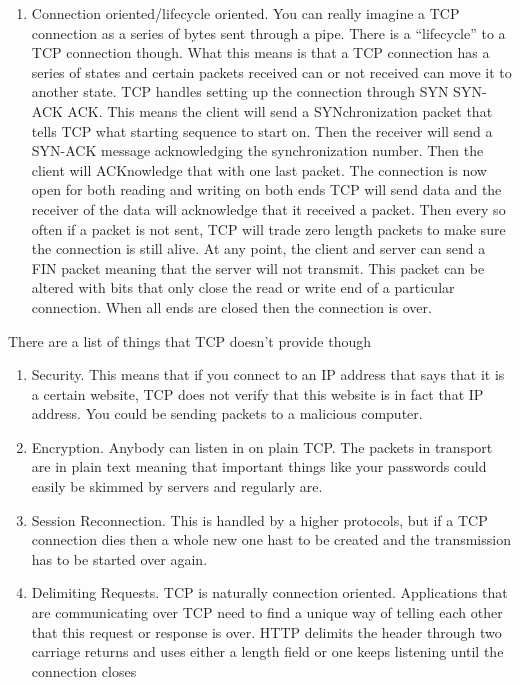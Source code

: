 \begin{enumerate}
\item Connection oriented/lifecycle oriented.
  You can really imagine a TCP connection as a series of bytes sent through a pipe.
  There is a ``lifecycle'' to a TCP connection though. What this means is that a TCP connection has a series of states and certain packets received can or not received can move it to another state.
  TCP handles setting up the connection through SYN SYN-ACK ACK. This means the client will send a SYNchronization packet that tells TCP what starting sequence to start on. Then the receiver will send a SYN-ACK message acknowledging the synchronization number.
  Then the client will ACKnowledge that with one last packet.
  The connection is now open for both reading and writing on both ends
  TCP will send data and the receiver of the data will acknowledge that it received a packet.
  Then every so often if a packet is not sent, TCP will trade zero length packets to make sure the connection is still alive.
  At any point, the client and server can send a FIN packet meaning that the server will not transmit.
  This packet can be altered with bits that only close the read or write end of a particular connection. When all ends are closed then the connection is over.
\end{enumerate}

There are a list of things that TCP doesn't provide though

\begin{enumerate}
\item Security.
  This means that if you connect to an IP address that says that it is a certain website, TCP does not verify that this website is in fact that IP address.
  You could be sending packets to a malicious computer.
\item Encryption.
  Anybody can listen in on plain TCP.
  The packets in transport are in plain text meaning that important things like your passwords could easily be skimmed by servers and regularly are.
\item Session Reconnection.
  This is handled by a higher protocols, but if a TCP connection dies then a whole new one hast to be created and the transmission has to be started over again.
\item Delimiting Requests.
  TCP is naturally connection oriented.
  Applications that are communicating over TCP need to find a unique way of telling each other that this request or response is over.
  HTTP delimits the header through two carriage returns and uses either a length field or one keeps listening until the connection closes
\end{enumerate}

